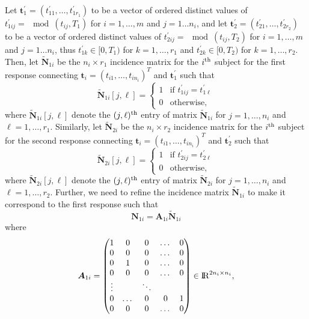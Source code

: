 \documentclass[12pt, notitlepage]{article}
\begin{document}
Let 
 $
\boldsymbol t_1^\prime = (t_{11}^\prime, \dots, t_{1r_1}^\prime)
 $
 to be a vector of ordered distinct values of $t_{1ij}^\prime =\mod{(t_{ij}, T_1)}$ for $i = 1, \dots, m$ and $j = 1\dots n_i$, and 
 let 
 $
\boldsymbol t_2^\prime = (t_{21}^\prime, \dots, t_{2r_2}^\prime)
 $
 to be a vector of ordered distinct values of $t_{2ij}^\prime =\mod{(t_{ij}, T_2)}$ for $i = 1, \dots, m$ and $j = 1\dots n_i$, 
 thus $t_{1k}^\prime \in [0, T_1)$ for $k = 1, \dots, r_1$ and
  $t_{2k}^\prime \in [0, T_2)$ for $k = 1, \dots, r_2$.
Then, let 
 $\boldsymbol {\tilde N}_{1i}$ be the $n_i \times r_1$ incidence matrix for the $i^{\rm th}$ subject 
 for the first response connecting 
 $
 \boldsymbol t_i = (t_{i1}, \dots, t_{in_i})^T 
 $
 and
 $\boldsymbol t^\prime_1$ such that
 $$
\boldsymbol {\tilde N}_{1i} [j, \ell] =
\begin{cases}
1 & \text{if } t_{1ij}^\prime = t_{1\ell}^\prime \\
0 & \text{otherwise},
\end{cases}
$$
where 
$\boldsymbol {\tilde N}_{1i} [j, \ell]$ denote the $(j, \ell)^{\rm th}$ entry of matrix 
$\boldsymbol {\tilde N}_{1i}$ for $j = 1, \dots, n_i$ and $\ell = 1, \dots, r_1$. 
Similarly, 
let 
 $\boldsymbol {\tilde N}_{2i}$ be the $n_i \times r_2$ incidence matrix for the $i^{\rm th}$ subject 
 for the second response connecting 
 $
 \boldsymbol t_i = (t_{i1}, \dots, t_{in_i})^T 
 $
 and
 $\boldsymbol t^\prime_2$ such that
 $$
\boldsymbol {\tilde N}_{2i} [j, \ell] =
\begin{cases}
1 & \text{if } t_{2ij}^\prime = t_{2\ell}^\prime \\
0 & \text{otherwise},
\end{cases}
$$
where 
$\boldsymbol {\tilde N}_{2i} [j, \ell]$ denote the $(j, \ell)^{\rm th}$ entry of matrix 
$\boldsymbol {\tilde N}_{2i}$ for $j = 1, \dots, n_i$ and $\ell = 1, \dots, r_2$. 
Further, we need to refine the incidence matrix $\boldsymbol {\tilde N}_{1i}$ to make it correspond to the first response such that 
$$
\boldsymbol N_{1i} = \boldsymbol A_{1i} \boldsymbol {\tilde N} _{1i}
$$
where 
\[
\boldsymbol A_{1i} =
 \begin{pmatrix}
   1 & 0 & 0 &  \dots & 0 \\
  0 & 0 & 0 &   \dots & 0 \\
  0 & 1 & 0 & \dots & 0 \\
   0 & 0 & 0 &   \dots & 0  \\
  \vdots &  & \ddots &  \\ 
 0 & \dots & 0  & 0 & 1\\
  0 & 0 & 0 &   \dots & 0 \\
 \end{pmatrix}
   \in {\rm I\!R}^{2n_i \times n_i},
 \]
\end{document}
